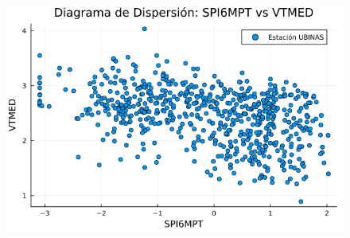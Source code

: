 \begin{figure}[htbp]
\begin{minipage}{0.32\textwidth}
    \includegraphics[width=\linewidth]{Capitulos/Scaterplot/UBINAS_SPI6MPT_vs_VTMED.png}
\end{minipage}

\vspace{0.5cm}  %


\end{figure}
